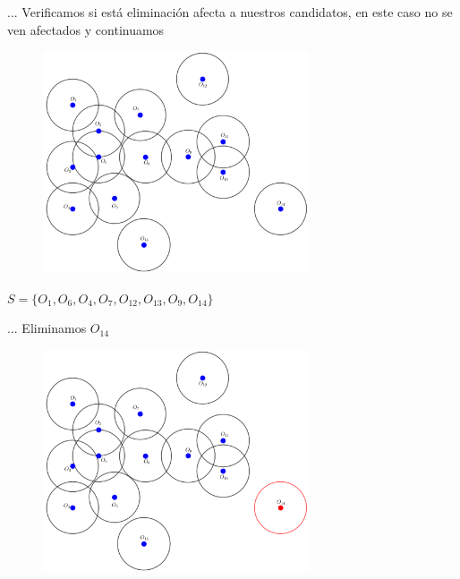 \begin{frame}{...}
  Verificamos si está eliminación afecta a nuestros candidatos, en este caso
  no se ven afectados y continuamos
  \begin{figure}  
    \centering
    \includegraphics[width=0.7\textwidth]{./Images/08.png}
  \end{figure}
  $S = \{O_1, O_6, O_4, O_7, O_{12}, O_{13}, O_9, O_{14}\}$
\end{frame}

\begin{frame}{...}
  Eliminamos $O_{14}$
  \begin{figure}  
    \centering
    \includegraphics[width=0.7\textwidth]{./Images/09.png}
  \end{figure}
  
\end{frame}

